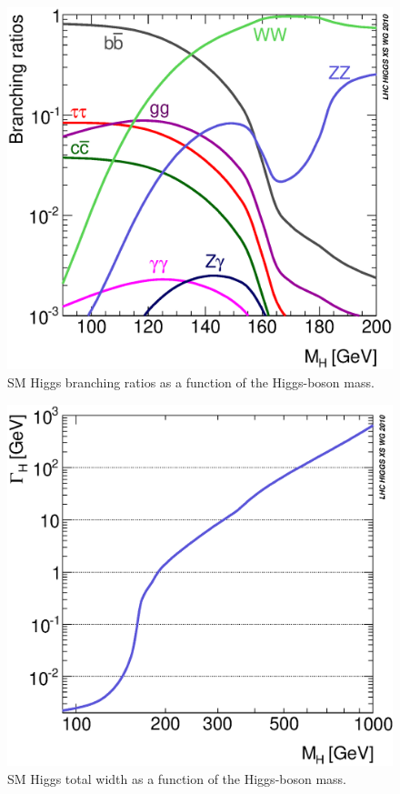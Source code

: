 
\begin{figure}[h]
  \centering\includegraphics[width=.70\linewidth]{YRHXS_BR/YRHXS_BR_fig1.eps}
  \caption{SM Higgs branching ratios as a function of the Higgs-boson mass.}
  \label{fig:SMBR200}
\end{figure}

\begin{figure}[h]
\centering\includegraphics[width=.70\linewidth]{YRHXS_BR/YRHXS_BR_fig2.eps}
\caption{SM Higgs total width  as a function of the Higgs-boson mass.}
\label{fig:SMWidth}
\end{figure}


